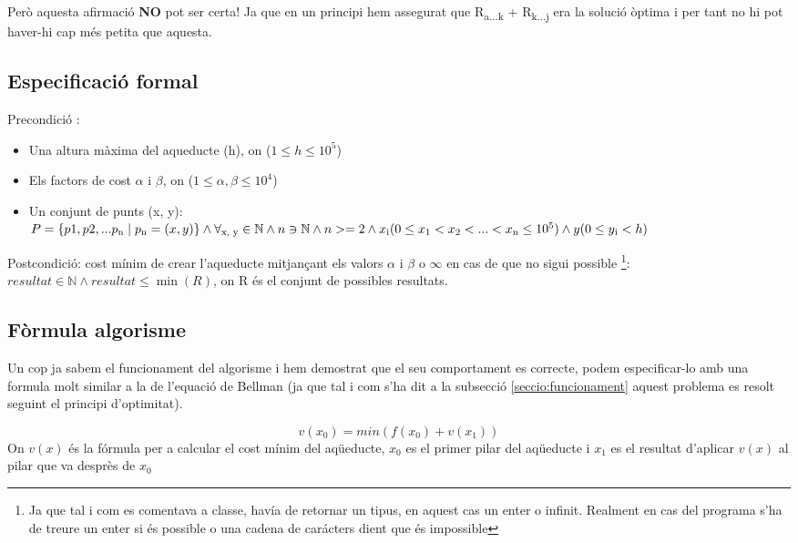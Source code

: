 \documentclass[12pt, letterpaper]{article}
\begin{document}
Però aquesta afirmació \textbf{NO} pot ser certa! Ja que en un principi hem assegurat que R\textsubscript{a...k} + R\textsubscript{k...j} era la solució òptima i per tant no hi pot haver-hi cap més petita que aquesta.


\subsection{Especificació formal}
Precondició :
\begin{itemize}
    \item Una altura màxima del aqueducte (h), on ($1 \leq h \leq 10^5$)
    \item Els factors de cost $\alpha$ i $\beta$, on ($1\leq \alpha, \beta \leq 10^4$)
    \item Un conjunt de punts (x, y):\\
        $P = \{p1, p2, ... p\textsubscript{n} \mid p\textsubscript{n} = (x, y) \} \land \forall \textsubscript{x, y} \in \mathbb{N} \land n \owns \mathbb{N} \land n >= 2 
        \land x\textsubscript{i} (0\leq x\textsubscript{1} < x\textsubscript{2} < ... < x\textsubscript{n} \leq 10^5) \land y (0 \leq y\textsubscript{i} < h) $

\end{itemize}
Postcondició: cost mínim de crear l'aqueducte mitjançant els valors $\alpha$ i $\beta$ o $\infty$ en cas de que no sigui possible \footnote{Ja que tal i com es comentava a classe, havía de retornar un tipus, en aquest cas un enter o infinit. Realment en cas del programa s'ha de treure un enter si és possible o una cadena de carácters dient que és impossible}:\\

        $ resultat \in \mathbb{N} \land resultat \leq \min(R) $, on R és el conjunt de possibles resultats.


\subsection{Fòrmula algorisme}
Un cop ja sabem el funcionament del algorisme i hem demostrat que el seu comportament es correcte, podem especificar-lo amb una formula molt similar a la de l'equació de Bellman (ja que tal i com s'ha dit a la subsecció \ref{seccio:funcionament} aquest problema es resolt seguint el principi d'optimitat).

\begin{center}
\begin{equation}
v(x_{0}) = min(f(x_{0}) + v(x_{1}))
\end{equation}
On $v(x)$ és la fórmula per a calcular el cost mínim del aqüeducte, $x_{0}$ es el primer pilar del aqüeducte i $x_{1}$ es el resultat d'aplicar $v(x)$ al pilar que va desprès de $x_{0}$
\end{center}
\end{document}
